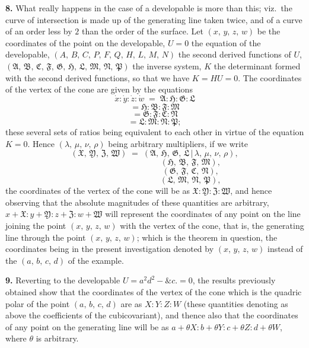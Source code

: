 \documentclass[11pt,a4paper]{article}
\providecommand{\mid}{\,|\,}
\begin{document}
\textbf{8.} What really happens in the case of a developable is more than this; viz.\ the curve of intersection is made up of the generating line taken twice, and of a curve of an order less by $2$ than the order of the surface. Let $(x,\,y,\,z,\,w)$ be the coordinates of the point on the developable, $U = 0$ the equation of the developable, $(A,\,B,\,C,\,P,\,F,\,Q,\,H,\,L,\,M,\,N)$ the second derived functions of $U$, $(\mathfrak{A},\,\mathfrak{B},\,\mathfrak{C},\,\mathfrak{F},\,\mathfrak{G},\,\mathfrak{H},\,\mathfrak{L},\,\mathfrak{M},\,\mathfrak{N},\,\mathfrak{P})$ the inverse system, $K$ the determinant formed with the second derived functions, so that we have $K = HU = 0$. The coordinates of the vertex of the cone are given by the equations
\[
\dot x : \dot y : \dot z : \dot w \;=\; \mathfrak{A} : \mathfrak{H} : \mathfrak{G} : \mathfrak{L}
\]
\[
= \mathfrak{H} : \mathfrak{B} : \mathfrak{F} : \mathfrak{M}
\]
\[
= \mathfrak{G} : \mathfrak{F} : \mathfrak{C} : \mathfrak{N}
\]
\[
= \mathfrak{L} : \mathfrak{M} : \mathfrak{N} : \mathfrak{P};
\]
these several sets of ratios being equivalent to each other in virtue of the equation $K = 0$. Hence $(\lambda,\,\mu,\,\nu,\,\rho)$ being arbitrary multipliers, if we write
\[
(\mathfrak{X},\,\mathfrak{Y},\,\mathfrak{Z},\,\mathfrak{W}) \;=\; (\mathfrak{A},\,\mathfrak{H},\,\mathfrak{G},\,\mathfrak{L}\mid \lambda,\,\mu,\,\nu,\,\rho),
\]
\[
\phantom{(\mathfrak{X},\,\mathfrak{Y},\,\mathfrak{Z},\,\mathfrak{W})\;=\;}(\mathfrak{H},\,\mathfrak{B},\,\mathfrak{F},\,\mathfrak{M}),
\]
\[
\phantom{(\mathfrak{X},\,\mathfrak{Y},\,\mathfrak{Z},\,\mathfrak{W})\;=\;}(\mathfrak{G},\,\mathfrak{F},\,\mathfrak{C},\,\mathfrak{N}),
\]
\[
\phantom{(\mathfrak{X},\,\mathfrak{Y},\,\mathfrak{Z},\,\mathfrak{W})\;=\;}(\mathfrak{L},\,\mathfrak{M},\,\mathfrak{N},\,\mathfrak{P}),
\]
the coordinates of the vertex of the cone will be as $\mathfrak{X} : \mathfrak{Y} : \mathfrak{Z} : \mathfrak{W}$, and hence observing that the absolute magnitudes of these quantities are arbitrary, $x + \mathfrak{X} : y + \mathfrak{Y} : z + \mathfrak{Z} : w + \mathfrak{W}$ will represent the coordinates of any point on the line joining the point $(x,\,y,\,z,\,w)$ with the vertex of the cone, that is, the generating line through the point $(x,\,y,\,z,\,w)$; which is the theorem in question, the coordinates being in the present investigation denoted by $(x,\,y,\,z,\,w)$ instead of the $(a,\,b,\,c,\,d)$ of the example.

\medskip

\textbf{9.} Reverting to the developable $U = a^2 d^2 - \&c. = 0$, the results previously obtained show that the coordinates of the vertex of the cone which is the quadric polar of the point $(a,\,b,\,c,\,d)$ are as $X : Y : Z : W$ (these quantities denoting as above the coefficients of the cubicovariant), and thence also that the coordinates of any point on the generating line will be as $a + \theta X : b + \theta Y : c + \theta Z : d + \theta W$, where $\theta$ is arbitrary.
\end{document}
